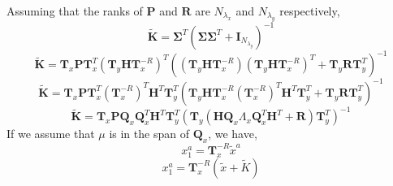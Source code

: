 \documentclass[11pt]{article} %
\DeclareMathOperator{\sd}{sd}
\newcommand{\mat}{\mathbf}
\begin{document}
Assuming that the ranks of $\mat{P}$ and $\mat{R}$ are $N_{\lambda_x}$
and $N_{\lambda_y}$ respectively,
\[
  \tilde{\mat{K}} = \mat{\Sigma}^T (\mat{\Sigma} \mat{\Sigma}^T +
  \mat{I}_{N_{\lambda_y}})^{-1}
\]
\[
  \tilde{\mat{K}} = \mat{T}_x \mat{P} \mat{T}_x^T (\mat{T}_y \mat{H}
  \mat{T}_x^{-R})^T \left((\mat{T}_y \mat{H} \mat{T}_x^{-R})(\mat{T}_y
  \mat{H} \mat{T}_x^{-R})^T + \mat{T}_y \mat{R} \mat{T}_y^T \right)^{-1}
\]
\[
  \tilde{\mat{K}} = \mat{T}_x \mat{P} \mat{T}_x^T \left( \mat{T}_x^{-R}
  \right)^T \mat{H}^T \mat{T}_y^T
  \left( \mat{T}_y \mat{H} \mat{T}_x^{-R} \left( \mat{T}_x^{-R}
    \right)^T \mat{H}^T \mat{T}_y^T + \mat{T}_y \mat{R} \mat{T}_y^T \right)^{-1}
\]
\[
  \tilde{\mat{K}} = \mat{T}_x \mat{P} \mat{Q}_x \mat{Q}_x^T \mat{H}^T \mat{T}_y^T
  \left( \mat{T}_y \left( \mat{H} \mat{Q}_x \Lambda_x \mat{Q}_x^T
      \mat{H}^T + \mat{R}\right) \mat{T}_y^T \right)^{-1}
\]
If we assume that $\mu$ is in the span of $\mat{Q}_x$, we have,
\[
   x^a_1 = \mat{T}_x^{-R} \tilde{x}^a
\]
\[
   x^a_1 = \mat{T}_x^{-R} \left( \tilde{x} + \tilde{K} \right)
\]






\end{document}
